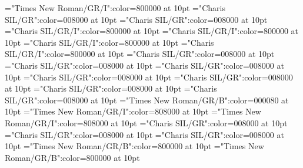 \documentclass[a4paper,twoside]{article}
\begin{document}
\font\spanheadwordreferencedentryreferencedentriesvisiblevariantentryrefsminorentryvariantheadwordspanspanspanspanminorentryvariantletDatadicBody="Times New Roman/GR/I":color=800000 at 10pt
\font\spanesspanminorentryvariantletDatadicBody="Charis SIL/GR":color=008000 at 10pt
\font\spanspanesspanminorentryvariantletDatadicBody="Charis SIL/GR":color=008000 at 10pt
\font\partofspeechspansensespanspanentryletDatadicBody="Charis SIL/GR/I":color=800000 at 10pt
\font\spanespartofspeechspansensespanspanentryletDatadicBody="Charis SIL/GR/I":color=800000 at 10pt
\font\spanpartofspeechmorphosyntaxanalysissensesensecontentsensesentryspanespartofspeechspansensespanspanentryletDatadicBody="Charis SIL/GR/I":color=800000 at 10pt
\font\spanpartofspeechmorphosyntaxanalysissensesensecontentsensesentrypartofspeechspansensespanspanentryletDatadicBody="Charis SIL/GR/I":color=800000 at 10pt
\font\spanesspansensespanspanentryletDatadicBody="Charis SIL/GR":color=008000 at 10pt
\font\spandefinitionsensesensecontentsensesentryspanesspansensespanspanentryletDatadicBody="Charis SIL/GR":color=008000 at 10pt
\font\spandefinitionsensesensecontentsensesentryspansensespanspanentryletDatadicBody="Charis SIL/GR":color=008000 at 10pt
\font\pictureentryentryletDatadicBody="Charis SIL/GR":color=008000 at 10pt
\font\pictureentrypictureentryentryletDatadicBody="Charis SIL/GR":color=008000 at 10pt
\font\captionContentpictureentryentryletDatadicBody="Charis SIL/GR":color=008000 at 10pt
\font\spancaptionContentpictureentryentryletDatadicBody="Charis SIL/GR":color=008000 at 10pt
\font\spanmxbspancaptionContentpictureentryentryletDatadicBody="Times New Roman/GR/B":color=000080 at 10pt
\font\comentariorestrictivosensesensecontentsensesmainentrycomplexsensespanspanentryletDatadicBody="Times New Roman/GR/I":color=808000 at 10pt
\font\spancomentariorestrictivosensesensecontentsensesmainentrycomplexsensespanspanentryletDatadicBody="Times New Roman/GR/I":color=808000 at 10pt
\font\spanescomentariorestrictivosensesensecontentsensesmainentrycomplexsensespanspanentryletDatadicBody="Charis SIL/GR":color=008000 at 10pt
\font\mainentrysubsensessensessensespanspanentryletDatadicBody="Charis SIL/GR":color=008000 at 10pt
\font\spanmainentrysubsensessensessensespanspanentryletDatadicBody="Charis SIL/GR":color=008000 at 10pt
\font\sensenumbersensecontentsensessensesensecontentsensesmainentrycomplexspanmainentrysubsensessensessensespanspanentryletDatadicBody="Times New Roman/GR/B":color=800000 at 10pt
\font\spansensenumbersensecontentsensessensesensecontentsensesmainentrycomplexspanmainentrysubsensessensessensespanspanentryletDatadicBody="Times New Roman/GR/B":color=800000 at 10pt
\end{document}
